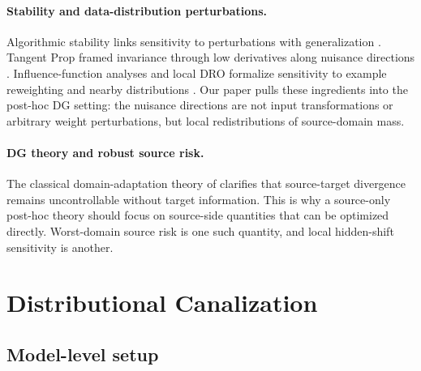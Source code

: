 \documentclass{article}
\theoremstyle{definition}
\begin{document}
\paragraph{Stability and data-distribution perturbations.}
Algorithmic stability links sensitivity to perturbations with generalization \citep{bousquet2002stability,hardt2016sgd}. Tangent Prop framed invariance through low derivatives along nuisance directions \citep{simard1991tangent}. Influence-function analyses and local DRO formalize sensitivity to example reweighting and nearby distributions \citep{koh2017influence,duchi2020variance,duchi2021learning}. Our paper pulls these ingredients into the post-hoc DG setting: the nuisance directions are not input transformations or arbitrary weight perturbations, but local redistributions of source-domain mass.

\paragraph{DG theory and robust source risk.}
The classical domain-adaptation theory of \citet{ben2010theory} clarifies that source-target divergence remains uncontrollable without target information. This is why a source-only post-hoc theory should focus on source-side quantities that can be optimized directly. Worst-domain source risk is one such quantity, and local hidden-shift sensitivity is another.

\section{Distributional Canalization}
\label{sec:canalization}

\subsection{Model-level setup}
\end{document}
